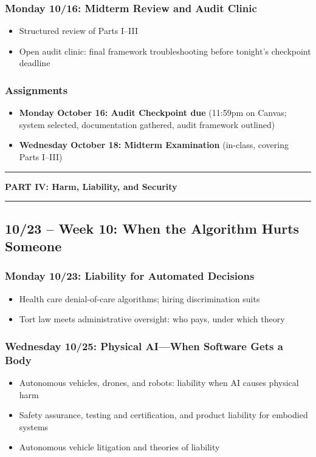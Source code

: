 \documentclass[12pt]{article}
\begin{document}
    \subsubsection*{Monday 10/16: Midterm Review and Audit Clinic}
        \begin{itemize}
            \item Structured review of Parts I--III
            \item Open audit clinic: final framework troubleshooting before tonight's checkpoint deadline
        \end{itemize}
    \subsubsection*{Assignments}
        \begin{itemize}
            \item \textbf{Monday October 16: Audit Checkpoint due} (11:59pm on Canvas; system selected, documentation gathered, audit framework outlined)
            \item \textbf{Wednesday October 18: Midterm Examination} (in-class, covering Parts I--III)
        \end{itemize}

\bigskip
\noindent\rule{\textwidth}{0.6pt}
\begin{center}\textbf{PART IV: Harm, Liability, and Security}\end{center}
\noindent\rule{\textwidth}{0.6pt}

\subsection*{10/23 -- Week 10: When the Algorithm Hurts Someone}
    \subsubsection*{Monday 10/23: Liability for Automated Decisions}
        \begin{itemize}
            \item Health care denial-of-care algorithms; hiring discrimination suits
            \item Tort law meets administrative oversight: who pays, under which theory
        \end{itemize}
    \subsubsection*{Wednesday 10/25: Physical AI---When Software Gets a Body}
        \begin{itemize}
            \item Autonomous vehicles, drones, and robots: liability when AI causes physical harm
            \item Safety assurance, testing and certification, and product liability for embodied systems
            \item Autonomous vehicle litigation and theories of liability
        \end{itemize}
\end{document}
